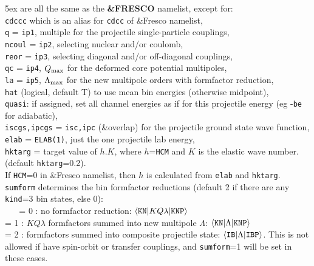 \documentclass[11pt]{article}
\begin{document}
\vspace{-3mm}
\hangindent 5ex
are all the same as the {\bf \&FRESCO} namelist, except for:\\
{\tt cdccc} which is an alias for {\tt cdcc} of \&Fresco namelist,\\
{\tt q} = {\tt ip1}, multiple for the projectile single-particle couplings,\\
{\tt ncoul} = {\tt ip2}, selecting nuclear and/or coulomb,\\
{\tt reor} = {\tt ip3}, selecting diagonal and/or off-diagonal couplings,\\
{\tt qc} = {\tt ip4}, $Q_{\rm max}$ for the deformed core potential multipoles,\\
{\tt la} = {\tt ip5}, $\Lambda_{\rm max}$ for the new multipole orders with formfactor reduction,\\
{\tt hat} (logical, default T) to use mean bin energies (otherwise midpoint),\\
{\tt quasi}: if assigned, set all channel energies as if for this projectile
energy (eg -{\tt be} for adiabatic),\\
{\tt iscgs,ipcgs} = {\tt isc,ipc} (\&overlap) for the projectile ground state wave
function,\\
{\tt elab} = {\tt ELAB(1)}, just the one projectile lab energy,\\
{\tt hktarg} = target value of $h.K$, where $h$={\tt HCM} and $K$ is the elastic wave number.
(default {\tt hktarg}=0.2). \\
\hspace*{1cm} If {\tt HCM}=0 in \&Fresco namelist,
then $h$ is calculated from {\tt elab} and {\tt hktarg}.\\



{\tt sumform} determines the bin formfactor reductions
(default 2 if there are any {\tt kind}=3 bin states, else 0):\\
~ ~   = 0 : no formfactor reduction:
     $\langle {\tt KN} | K Q \lambda | {\tt KNP} \rangle$
\\    = 1 : $KQ\lambda$ formfactors summed into new multipole $\Lambda$:
     $\langle {\tt KN} | \Lambda | {\tt KNP} \rangle$
\\    = 2 : formfactors summed into composite projectile state:
     $\langle {\tt IB} | {\Lambda} | {\tt IBP} \rangle$.
      This is not allowed if have spin-orbit or transfer couplings, and
      {\tt sumform}=1 will be set in these cases.\\
\end{document}

